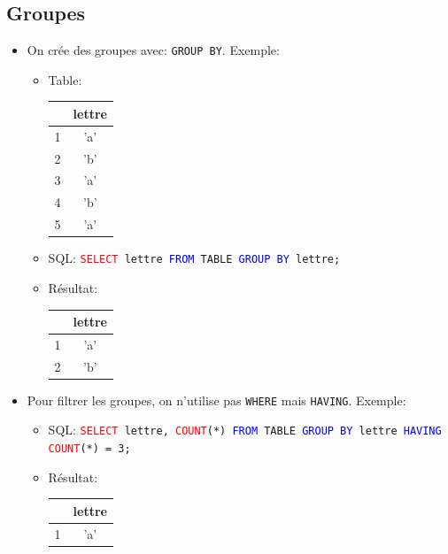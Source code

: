 \documentclass[a4paper]{article}
\begin{document}
\subsection{Groupes}





\begin{itemize}



\item On crée des groupes avec: \texttt{GROUP BY}. Exemple:
\begin{itemize}
    \item Table:
    \begin{center}
        \begin{tabular}{|c|c|} \hline
            & lettre \\ \hline
            1 & 'a' \\ \hline
            2 & 'b' \\ \hline
            3 & 'a' \\ \hline
            4 & 'b' \\ \hline
            5 & 'a' \\ \hline
        \end{tabular}
    \end{center}
    \item SQL: \texttt{\textcolor{red}{SELECT} lettre \textcolor{blue}{FROM} TABLE \textcolor{blue}{GROUP BY} lettre;}
    \item Résultat:
    \begin{center}
        \begin{tabular}{|c|c|} \hline
            & lettre \\ \hline
            1 & 'a' \\ \hline
            2 & 'b' \\ \hline
        \end{tabular}
    \end{center}
\end{itemize}



\item Pour filtrer les groupes, on n'utilise pas \texttt{WHERE} mais \texttt{HAVING}. Exemple:
\begin{itemize}
    \item SQL: \texttt{\textcolor{red}{SELECT} lettre, \textcolor{red}{COUNT}(*) \textcolor{blue}{FROM} TABLE \textcolor{blue}{GROUP BY} lettre \textcolor{blue}{HAVING} \textcolor{red}{COUNT}(*) = 3;}
    \item Résultat:
    \begin{center}
        \begin{tabular}{|c|c|} \hline
            & lettre \\ \hline
            1 & 'a' \\ \hline
        \end{tabular}
    \end{center}
\end{itemize}



\end{itemize}
\end{document}
